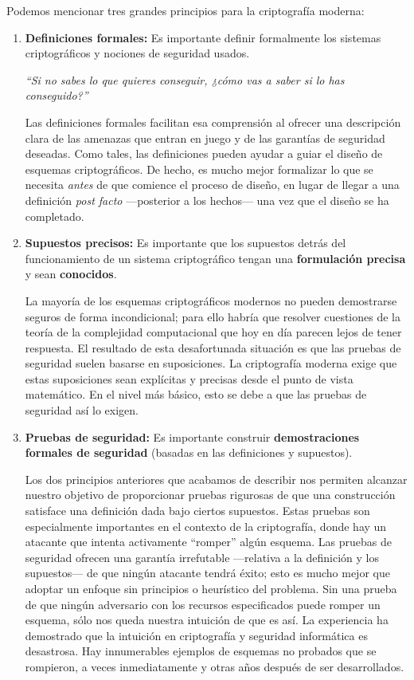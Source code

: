 Podemos mencionar tres grandes principios para la criptografía moderna:
\begin{enumerate}
    \item \textbf{Definiciones formales:} Es importante definir formalmente los sistemas criptográficos y nociones de seguridad usados.
          \begin{center}
              \textit{``Si no sabes lo que quieres conseguir, ¿cómo vas a saber si lo has conseguido?''}
          \end{center}

          Las definiciones formales facilitan esa comprensión al ofrecer una descripción clara de las amenazas que entran en juego y de las garantías de seguridad deseadas. Como tales, las definiciones pueden ayudar a guiar el diseño de esquemas criptográficos. De hecho, es mucho mejor formalizar lo que se necesita \textit{antes} de que comience el proceso de diseño, en lugar de llegar a una definición \textit{post facto} ---posterior a los hechos--- una vez que el diseño se ha completado.

    \item \textbf{Supuestos precisos:} Es importante que los supuestos detrás del funcionamiento de un sistema criptográfico tengan una \textbf{formulación precisa} y sean \textbf{conocidos}. \medbreak

          La mayoría de los esquemas criptográficos modernos no pueden demostrarse seguros de forma incondicional; para ello habría que resolver cuestiones de la teoría de la complejidad computacional que hoy en día parecen lejos de tener respuesta. El resultado de esta desafortunada situación es que las pruebas de seguridad suelen basarse en suposiciones. La criptografía moderna exige que estas suposiciones sean explícitas y precisas desde el punto de vista matemático. En el nivel más básico, esto se debe a que las pruebas de seguridad así lo exigen.

    \item \textbf{Pruebas de seguridad:} Es importante construir \textbf{demostraciones formales de seguridad} (basadas en las definiciones y supuestos). \medbreak

          Los dos principios anteriores que acabamos de describir nos permiten alcanzar nuestro objetivo de proporcionar pruebas rigurosas de que una construcción satisface una definición dada bajo ciertos supuestos. Estas pruebas son especialmente importantes en el contexto de la criptografía, donde hay un atacante que intenta activamente ``romper'' algún esquema. Las pruebas de seguridad ofrecen una garantía irrefutable ---relativa a la definición y los supuestos--- de que ningún atacante tendrá éxito; esto es mucho mejor que adoptar un enfoque sin principios o heurístico del problema. Sin una prueba de que ningún adversario con los recursos especificados puede romper un esquema, sólo nos queda nuestra intuición de que es así. La experiencia ha demostrado que la intuición en criptografía y seguridad informática es desastrosa. Hay innumerables ejemplos de esquemas no probados que se rompieron, a veces inmediatamente y otras años después de ser desarrollados.
\end{enumerate}

